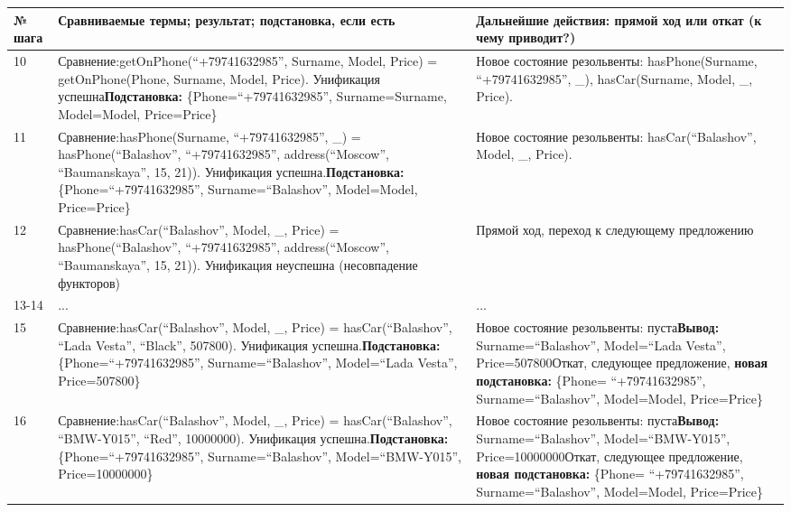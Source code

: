 \documentclass[14pt,a4paper]{scrreprt}
\begin{document}
\begin{table}[H]
	\begin{tabular}{|p{1.2cm\small}|p{9cm\small}|p{5cm\small}|}	
		\hline
		№ шага & Сравниваемые термы; результат; подстановка, если есть & Дальнейшие действия: прямой ход или откат (к чему приводит?)\\
		\hline
		10 & Сравнение:\linebreak getOnPhone(``+79741632985'', Surname, Model, Price) = getOnPhone(Phone, Surname, Model, Price). Унификация успешна\linebreak \textbf{Подстановка:} \{Phone=``+79741632985'', Surname=Surname, Model=Model, Price=Price\} &  Новое состояние резольвенты: hasPhone(Surname, ``+79741632985'', \_), hasCar(Surname, Model, \_, Price).\\ 
		\hline
		11 & Сравнение:\linebreak hasPhone(Surname, ``+79741632985'', \_) = hasPhone(``Balashov'', ``+79741632985'', address(``Moscow'', ``Baumanskaya'', 15, 21)). Унификация успешна.\linebreak \textbf{Подстановка:} \{Phone=``+79741632985'', Surname=``Balashov'', Model=Model, Price=Price\} & Новое состояние резольвенты: hasCar(``Balashov'', Model, \_, Price). \\
		\hline
		12 & Сравнение:\linebreak hasCar(``Balashov'', Model, \_, Price) = hasPhone(``Balashov'', ``+79741632985'', address(``Moscow'', ``Baumanskaya'', 15, 21)). Унификация неуспешна (несовпадение функторов) & Прямой ход, переход к следующему предложению\\
		\hline
		13-14 & ... & ...\\
		\hline
		15 & Сравнение:\linebreak hasCar(``Balashov'', Model, \_, Price) = hasCar(``Balashov'', ``Lada Vesta'', ``Black'', 507800). Унификация успешна.\linebreak \textbf{Подстановка:} \{Phone=``+79741632985'', Surname=``Balashov'', Model=``Lada Vesta'', Price=507800\} & Новое состояние резольвенты: пуста\linebreak \textbf{Вывод:} Surname=``Balashov'', Model=``Lada Vesta'', Price=507800\linebreak Откат, следующее предложение, \textbf{новая подстановка:} \{Phone= ``+79741632985'', Surname=``Balashov'', Model=Model, Price=Price\}\\
		\hline
		16 & Сравнение:\linebreak hasCar(``Balashov'', Model, \_, Price) = hasCar(``Balashov'', ``BMW-Y015'', ``Red'', 10000000). Унификация успешна.\linebreak \textbf{Подстановка:} \{Phone=``+79741632985'', Surname=``Balashov'', Model=``BMW-Y015'', Price=10000000\} & Новое состояние резольвенты: пуста\linebreak \textbf{Вывод:} Surname=``Balashov'', Model=``BMW-Y015'', Price=10000000\linebreak Откат, следующее предложение, \textbf{новая подстановка:} \{Phone= ``+79741632985'', Surname=``Balashov'', Model=Model, Price=Price\}\\
		\hline
	\end{tabular}
\end{table}
\end{document}
